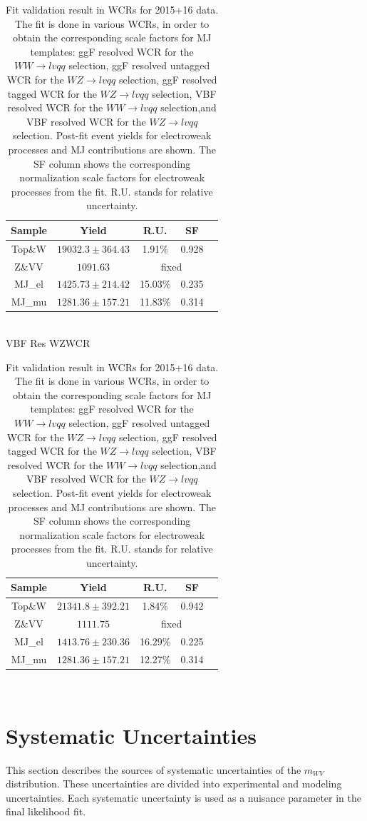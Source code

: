 \begin{table}[ht]
\begin{tabular}{|c|c|c|c|c|}
      \hline
     Sample    & Yield   & R.U.    & SF    \\ \hline
     Top\&W    & $19032.3\pm 364.43$  & 1.91\%  & 0.928  \\ \hline
     Z\&VV     & $1091.63$ & \multicolumn{2}{c|}{fixed} \\ \hline
     MJ\_el    & $1425.73\pm 214.42$  & 15.03\%  &0.235   \\ \hline
     MJ\_mu    & $1281.36\pm 157.21$  & 11.83\%  &0.314   \\ \hline
     \end{tabular}\hfill%
     \\
     \large{VBF Res WZWCR\\ }
     \begin{tabular}{|c|c|c|c|c|}
      \hline
     Sample    & Yield   & R.U.    & SF    \\ \hline
     Top\&W    & $21341.8\pm 392.21$  & 1.84\%  & 0.942  \\ \hline
     Z\&VV     & $1111.75$ & \multicolumn{2}{c|}{fixed} \\ \hline
     MJ\_el    & $1413.76\pm 230.36$  & 16.29\%  &0.225   \\ \hline
     MJ\_mu    & $1281.36\pm 157.21$  & 12.27\%  &0.314   \\ \hline
     \end{tabular}\hfill%
     \\
\caption{\label{tab:template_validation_CR} Fit validation result in WCRs for 2015+16 data. 
The fit is done in various WCRs, in order to obtain the corresponding scale factors for MJ templates: ggF resolved WCR for the $WW\to lvqq$ selection, ggF resolved untagged WCR for the $WZ\to lvqq$ selection,  ggF resolved tagged WCR for the $WZ\to lvqq$ selection,  VBF resolved WCR for the $WW\to lvqq$ selection,and VBF resolved WCR for the $WZ\to lvqq$ selection. Post-fit event yields for electroweak processes and MJ contributions are shown. The SF column shows the corresponding normalization scale factors for electroweak processes from the fit.
R.U. stands for relative uncertainty.
}
\end{table}



\chapter{Systematic Uncertainties}
This section describes the sources of systematic uncertainties of the $m_{WV}$ distribution. These uncertainties are divided into experimental and modeling uncertainties. Each systematic uncertainty is used as a nuisance parameter in the final likelihood fit.


